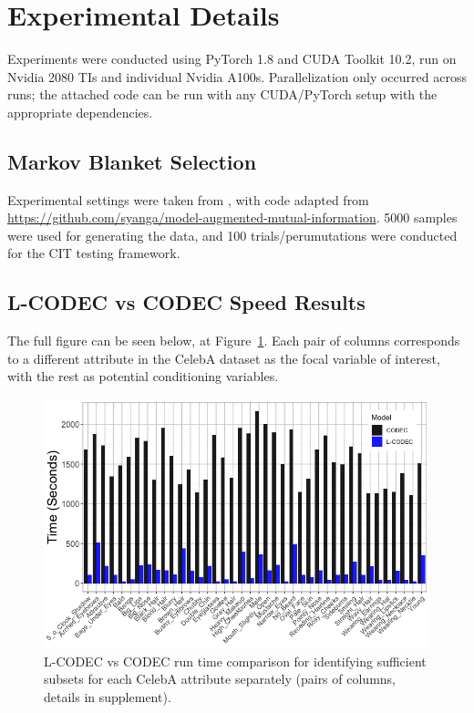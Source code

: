 \section{Experimental Details}
Experiments were conducted using PyTorch 1.8 and CUDA Toolkit 10.2, run on Nvidia 2080 TIs and individual Nvidia A100s. Parallelization only occurred across runs; the attached code can be run with any CUDA/PyTorch setup with the appropriate dependencies.

\subsection{Markov Blanket Selection}
Experimental settings were taken from \cite{bullseye}, with code adapted from  \url{https://github.com/syanga/model-augmented-mutual-information}. 5000 samples were used for generating the data, and 100 trials/perumutations were conducted for the CIT testing framework. 

\subsection{L-CODEC vs CODEC Speed Results}
The full figure can be seen below, at Figure~\ref{fig:full_speed_hist}. Each pair of columns corresponds to a different attribute in the CelebA dataset as the focal variable of interest, with the rest as potential conditioning variables.
\begin{figure}
    \centering
    \includegraphics[width=\columnwidth]{5_unlearn/figs/Speed_Hist.png}
    \caption[L-CODEC speedup vs. CODEC]{\label{fig:full_speed_hist} L-CODEC vs CODEC run time comparison for identifying sufficient subsets for each CelebA attribute separately (pairs of columns, details in supplement).}
\end{figure}

